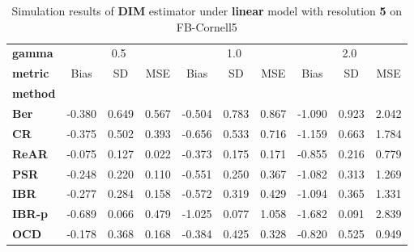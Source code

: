 \begin{table}
\centering
\caption{Simulation results of \textbf{DIM} estimator under \textbf{linear} model with resolution \textbf{5} on FB-Cornell5}
\begin{tabular}{lccccccccc}
\toprule
\textbf{gamma} & \multicolumn{3}{c}{0.5} & \multicolumn{3}{c}{1.0} & \multicolumn{3}{c}{2.0} \\
\textbf{metric} &   Bias &     SD &    MSE &   Bias &     SD &    MSE &   Bias &     SD &    MSE \\
\textbf{method} &        &        &        &        &        &        &        &        &        \\
\midrule
\textbf{Ber} & -0.380 &  0.649 &  0.567 & -0.504 &  0.783 &  0.867 & -1.090 &  0.923 &  2.042 \\
\textbf{CR} & -0.375 &  0.502 &  0.393 & -0.656 &  0.533 &  0.716 & -1.159 &  0.663 &  1.784 \\
\textbf{ReAR} & -0.075 &  0.127 &  0.022 & -0.373 &  0.175 &  0.171 & -0.855 &  0.216 &  0.779 \\
\textbf{PSR} & -0.248 &  0.220 &  0.110 & -0.551 &  0.250 &  0.367 & -1.082 &  0.313 &  1.269 \\
\textbf{IBR} & -0.277 &  0.284 &  0.158 & -0.572 &  0.319 &  0.429 & -1.094 &  0.365 &  1.331 \\
\textbf{IBR-p} & -0.689 &  0.066 &  0.479 & -1.025 &  0.077 &  1.058 & -1.682 &  0.091 &  2.839 \\
\textbf{OCD} & -0.178 &  0.368 &  0.168 & -0.384 &  0.425 &  0.328 & -0.820 &  0.525 &  0.949 \\
\bottomrule
\end{tabular}
\end{table}
